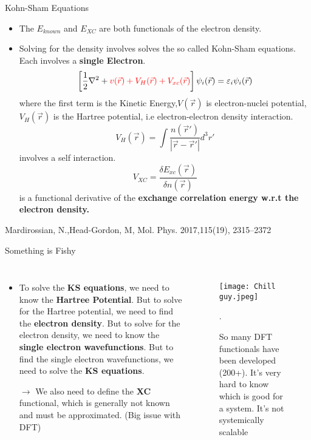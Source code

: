 \documentclass[10pt, aspectratio=169]{beamer}
\begin{document}
\begin{frame}{Kohn-Sham Equations}
\begin{itemize}
    \item The $E_{known}$ and $E_{XC}$ are both functionals of  the electron density.
    \item Solving for the density involves solves the so called Kohn-Sham equations. Each involves a \textbf{single Electron}.
    \begin{equation}
        \left[\frac{1}{2}\nabla^2+{\color{red}v(\vec r)+V_H(\vec r) + V_{xc}(\vec r)}\right] \psi_i(\vec r) = \varepsilon_i\psi_i(\vec r)
    \end{equation} where the first term is the Kinetic Energy,$V(\vec r)$ is electron-nuclei potential, $V_H(\vec r)$ is the Hartree potential, i.e electron-electron density interaction.
    \begin{equation}
        V_H(\vec r) = \int \frac{n(\vec r')}{|\vec r - \vec r'|}d^3r'
    \end{equation} involves a self interaction. 
    \begin{equation}
        V_{XC} = \frac{\delta E_{xc}(\vec r)}{\delta n(\vec r)}
    \end{equation} is a functional derivative of the \textbf{exchange correlation energy w.r.t the electron density.}
\end{itemize}
\centering
    \vfill
    \vspace{0.4cm}
    \scriptsize{Mardirossian, N.,Head-Gordon, M, Mol. Phys. 2017,115(19), 2315–2372}
    
\end{frame}
\begin{frame}{Something is Fishy}
\begin{columns}
    \begin{itemize}
        \item To solve the \textbf{KS equations}, we need to know the \textbf{Hartree Potential}. But to solve for the Hartree potential, we need to find the \textbf{electron density}. But to solve for the electron density, we need to know the \textbf{single electron wavefunctions}. But to find the single electron wavefunctions, we need to solve the \textbf{KS equations}.

        $\rightarrow$ \color{red}We also need to define the \textbf{XC} functional, which is generally not known and must be approximated.
        (Big issue with DFT)
    \end{itemize}
    \begin{figure}
        \centering
        \texttt{[image: Chill guy.jpeg]}
        \caption*{So many DFT functionals have been developed (200+). It's very hard to know which is good for a system. It's not systemically scalable}.
        \label{fig:enter-label}
    \end{figure}
\end{columns}
    
\end{frame}
\end{document}
